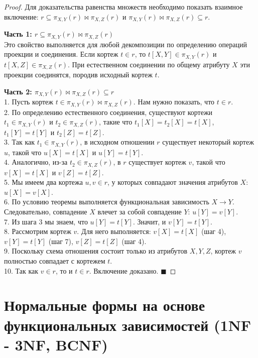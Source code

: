 \documentclass[12pt,a4paper]{article}
\theoremstyle{definition}
\theoremstyle{plain}
\begin{document}
\begin{proof}
Для доказательства равенства множеств необходимо показать взаимное включение: $r \subseteq \pi_{X, Y}(r) \bowtie \pi_{X, Z}(r)$ и $\pi_{X, Y}(r) \bowtie \pi_{X, Z}(r) \subseteq r$.

\textbf{Часть 1: $r \subseteq \pi_{X, Y}(r) \bowtie \pi_{X, Z}(r)$} \\
Это свойство выполняется для любой декомпозиции по определению операций проекции и соединения. Если кортеж $t \in r$, то $t[X, Y] \in \pi_{X, Y}(r)$ и $t[X, Z] \in \pi_{X, Z}(r)$. При естественном соединении по общему атрибуту $X$ эти проекции соединятся, породив исходный кортеж $t$.

\textbf{Часть 2: $\pi_{X, Y}(r) \bowtie \pi_{X, Z}(r) \subseteq r$} \\
1. Пусть кортеж $t \in \pi_{X, Y}(r) \bowtie \pi_{X, Z}(r)$. Нам нужно показать, что $t \in r$. \\
2. По определению естественного соединения, существуют кортежи $t_1 \in \pi_{X, Y}(r)$ и $t_2 \in \pi_{X, Z}(r)$, такие что $t_1[X] = t_2[X] = t[X]$, $t_1[Y] = t[Y]$ и $t_2[Z] = t[Z]$. \\
3. Так как $t_1 \in \pi_{X,Y}(r)$, в исходном отношении $r$ существует некоторый кортеж $u$, такой что $u[X] = t[X]$ и $u[Y] = t[Y]$. \\
4. Аналогично, из-за $t_2 \in \pi_{X,Z}(r)$, в $r$ существует кортеж $v$, такой что $v[X] = t[X]$ и $v[Z] = t[Z]$. \\
5. Мы имеем два кортежа $u, v \in r$, у которых совпадают значения атрибутов $X$: $u[X] = v[X]$. \\
6. По условию теоремы выполняется функциональная зависимость $X \to Y$. Следовательно, совпадение $X$ влечет за собой совпадение $Y$: $u[Y] = v[Y]$. \\
7. Из шага 3 мы знаем, что $u[Y] = t[Y]$. Значит, и $v[Y] = t[Y]$. \\
8. Рассмотрим кортеж $v$. Для него выполняется: $v[X] = t[X]$ (шаг 4), $v[Y] = t[Y]$ (шаг 7), $v[Z] = t[Z]$ (шаг 4). \\
9. Поскольку схема отношения состоит только из атрибутов $X, Y, Z$, кортеж $v$ полностью совпадает с кортежем $t$. \\
10. Так как $v \in r$, то и $t \in r$. Включение доказано. $\blacksquare$
\end{proof}


\section{Нормальные формы на основе функциональных зависимостей (1NF - 3NF, BCNF)}
\end{document}
